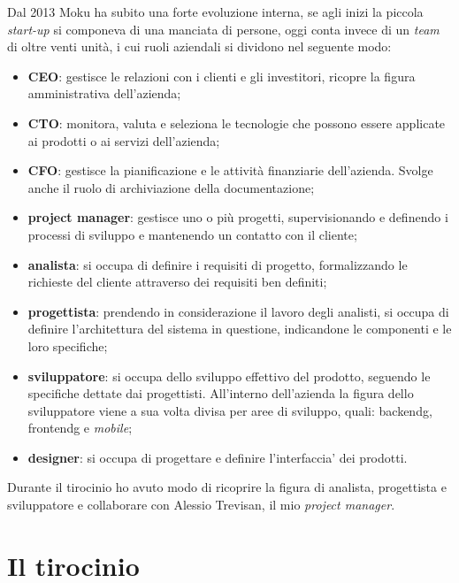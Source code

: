 Dal 2013 Moku ha subito una forte evoluzione interna, se agli inizi la piccola \textit{start-up} si componeva di una manciata di persone, oggi conta invece di un \textit{team} di oltre venti unità, i cui ruoli aziendali si dividono nel seguente modo:
\begin{itemize}
\item \textbf{CEO}: gestisce le relazioni con i clienti e gli investitori, ricopre la figura amministrativa dell'azienda;
\item \textbf{CTO}: monitora, valuta e seleziona le tecnologie che possono essere applicate ai prodotti o ai servizi dell'azienda;
\item \textbf{CFO}: gestisce la pianificazione e le attività finanziarie dell'azienda. Svolge anche il ruolo di archiviazione della documentazione;
\item \textbf{project manager}: gestisce uno o più progetti, supervisionando e definendo i processi di sviluppo e mantenendo un contatto con il cliente;
\item \textbf{analista}: si occupa di definire i requisiti di progetto, formalizzando le richieste del cliente attraverso dei requisiti ben definiti;
\item \textbf{progettista}: prendendo in considerazione il lavoro degli analisti, si occupa di definire l'architettura del sistema in questione, indicandone le componenti e le loro specifiche;
\item \textbf{sviluppatore}: si occupa dello sviluppo effettivo del prodotto, seguendo le specifiche dettate dai progettisti. All'interno dell'azienda la figura dello sviluppatore viene a sua volta divisa per aree di sviluppo, quali: \gls{backendg}, \gls{frontendg} e \textit{mobile};
\item \textbf{designer}: si occupa di progettare e definire l'interfaccia' dei prodotti.
\end{itemize}

\noindent Durante il tirocinio ho avuto modo di ricoprire la figura di analista, progettista e sviluppatore e collaborare con Alessio Trevisan, il mio \textit{project manager}. 

\section{Il tirocinio}

